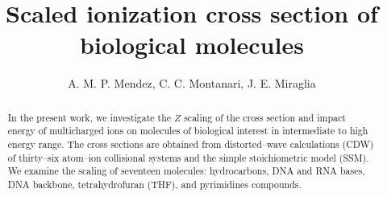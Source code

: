 \documentclass[10pt,showpacs,twocolumn]{revtex4}
\begin{document}
\title[Scaled ionization cross section of biological molecules]{
Scaled ionization cross section of biological molecules}
\author{A. M. P. Mendez, C. C. Montanari, J. E. Miraglia}


\begin{abstract}
In the present work, we investigate the $Z$ scaling of the cross section 
and impact energy of multicharged ions on molecules of biological 
interest in intermediate to high energy range. 
The cross sections are obtained from distorted--wave calculations (CDW) 
of thirty--six atom--ion collisional systems and the simple 
stoichiometric model (SSM). 
We examine the scaling of seventeen molecules: hydrocarbons, 
DNA and RNA bases, DNA backbone, tetrahydrofuran (THF), and pyrimidines
compounds. 
\end{abstract}


\maketitle

\end{document}
